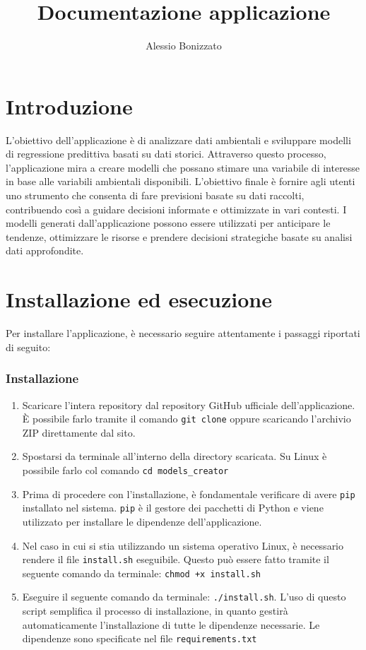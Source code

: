 \documentclass[a4paper,10pt]{article}
\newcommand{\rootDirectory}{models\_creator}
\begin{document}
\title{Documentazione applicazione}
\author{Alessio Bonizzato}
\date{}
\maketitle %

\newpage
\tableofcontents
\newpage
\section{Introduzione}
L'obiettivo dell'applicazione è di analizzare dati ambientali e sviluppare modelli di regressione predittiva basati su dati storici. 
Attraverso questo processo, l'applicazione mira a creare modelli che possano stimare una variabile di interesse in base alle variabili ambientali disponibili. 
L'obiettivo finale è fornire agli utenti uno strumento che consenta di fare previsioni basate su dati raccolti, contribuendo così a guidare decisioni informate 
e ottimizzate in vari contesti. I modelli generati dall'applicazione possono essere utilizzati per anticipare le tendenze, 
ottimizzare le risorse e prendere decisioni strategiche basate su analisi dati approfondite.

\section{Installazione ed esecuzione}
Per installare l'applicazione, è necessario seguire attentamente i passaggi riportati di seguito:

\subsubsection*{Installazione}
\begin{enumerate}
  \item Scaricare l'intera repository dal repository GitHub ufficiale dell'applicazione. 
  È possibile farlo tramite il comando \texttt{git clone} oppure scaricando l'archivio ZIP direttamente dal sito.
  \item Spostarsi da terminale all'interno della directory scaricata. Su Linux è possibile farlo col comando \texttt{cd \rootDirectory}
  \item Prima di procedere con l'installazione, è fondamentale verificare di avere \texttt{pip} installato nel sistema. 
  \texttt{pip} è il gestore dei pacchetti di Python e viene utilizzato per installare le dipendenze dell'applicazione.
  \item Nel caso in cui si stia utilizzando un sistema operativo Linux, è necessario rendere il file \texttt{install.sh} eseguibile. 
  Questo può essere fatto tramite il seguente comando da terminale: \texttt{chmod +x install.sh}
  \item Eseguire il seguente comando da terminale: \texttt{./install.sh}. L'uso di questo script semplifica il processo di installazione, 
  in quanto gestirà automaticamente l'installazione di tutte le dipendenze necessarie. Le dipendenze sono specificate nel file \texttt{requirements.txt}
\end{enumerate}
\end{document}
